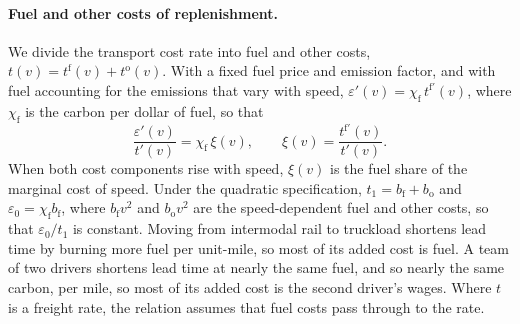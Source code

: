 \documentclass[11pt]{article}
\numberwithin{proposition}{section}
\theoremstyle{definition}
\theoremstyle{remark}
\theoremstyle{plain}
\begin{document}
\paragraph{Fuel and other costs of replenishment.} We divide the transport cost rate into fuel and other costs,
$t(v)=t^{\mathrm f}(v)+t^{\mathrm o}(v)$. With a fixed
fuel price and emission factor, and with fuel accounting for the emissions that vary with speed,
$\varepsilon'(v)=\chi_{\mathrm f}\,t^{\mathrm f\prime}(v)$, where $\chi_{\mathrm f}$ is the carbon per dollar of fuel, so that
\begin{equation}\label{eq:rtfuel}
  \frac{\varepsilon'(v)}{t'(v)}=\chi_{\mathrm f}\,\xi(v),\qquad \xi(v)=\frac{t^{\mathrm f\prime}(v)}{t'(v)}.
\end{equation}
When both cost components rise with speed, $\xi(v)$ is the fuel share of the marginal cost of speed. Under the
quadratic specification, $t_1=b_{\mathrm f}+b_{\mathrm o}$ and $\varepsilon_0=\chi_{\mathrm f} b_{\mathrm f}$, where $b_{\mathrm f}v^2$ and $b_{\mathrm o}v^2$ are the
speed-dependent fuel and other costs, so that $\varepsilon_0/t_1$ is constant. Moving from intermodal rail to truckload shortens lead time by burning more fuel per unit-mile, so most of its
added cost is fuel. A team of two drivers shortens lead time at nearly the same fuel, and so nearly the same
carbon, per mile, so most of its added cost is the second driver's wages. Where $t$ is a freight rate, the relation assumes that fuel costs pass through to the
rate.
\end{document}
